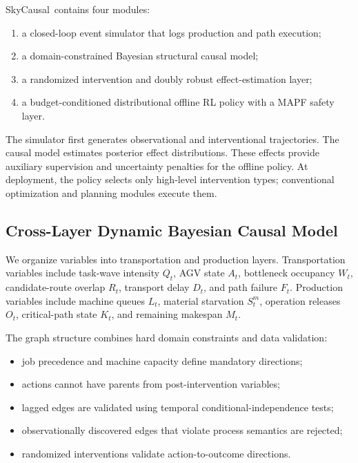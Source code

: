 \documentclass[11pt,a4paper]{article}
\newcommand{\method}{SkyCausal}
\begin{document}
\method\ contains four modules:

\begin{enumerate}[leftmargin=*]
    \item a closed-loop event simulator that logs production and path execution;
    \item a domain-constrained Bayesian structural causal model;
    \item a randomized intervention and doubly robust effect-estimation layer;
    \item a budget-conditioned distributional offline RL policy with a MAPF
    safety layer.
\end{enumerate}

The simulator first generates observational and interventional trajectories.
The causal model estimates posterior effect distributions. These effects provide
auxiliary supervision and uncertainty penalties for the offline policy. At
deployment, the policy selects only high-level intervention types; conventional
optimization and planning modules execute them.

\subsection{Cross-Layer Dynamic Bayesian Causal Model}

We organize variables into transportation and production layers. Transportation
variables include task-wave intensity \(Q_t\), AGV state \(A_t\), bottleneck
occupancy \(W_t\), candidate-route overlap \(R_t\), transport delay \(D_t\), and
path failure \(F_t\). Production variables include machine queues \(L_t\),
material starvation \(S_t^{m}\), operation releases \(O_t\), critical-path state
\(K_t\), and remaining makespan \(M_t\).

The graph structure combines hard domain constraints and data validation:
\begin{itemize}[leftmargin=*]
    \item job precedence and machine capacity define mandatory directions;
    \item actions cannot have parents from post-intervention variables;
    \item lagged edges are validated using temporal conditional-independence
    tests;
    \item observationally discovered edges that violate process semantics are
    rejected;
    \item randomized interventions validate action-to-outcome directions.
\end{itemize}
\end{document}
